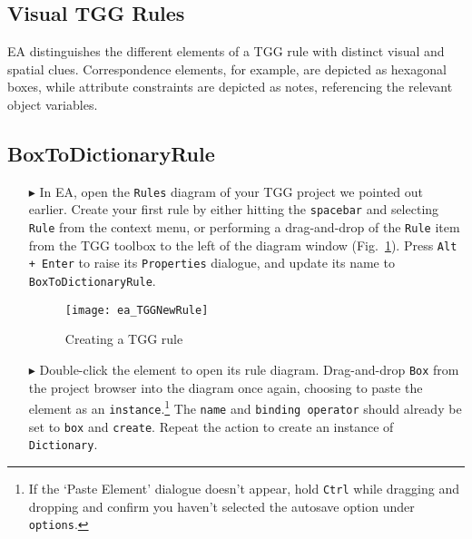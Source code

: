 \newpage
\hypertarget{rules vis}{}
\subsection{Visual TGG Rules}
\visHeader

EA distinguishes the different elements of a TGG rule with distinct visual and spatial clues. Correspondence elements, for example, are depicted as
hexagonal boxes, while attribute constraints are depicted as notes, referencing the relevant object variables.

\subsection{BoxToDictionaryRule}

\begin{enumerate}

\item[$\blacktriangleright$] In EA, open the \texttt{Rules} diagram of your TGG project we pointed out earlier. Create your first rule by either hitting the
\texttt{spacebar} and selecting \texttt{Rule} from the context menu, or performing a drag-and-drop of the \texttt{Rule} item from the TGG toolbox to the left of
the diagram window (Fig.~\ref{ea:create_tgg_rule}). Press \texttt{Alt + Enter} to raise its \texttt{Properties} dialogue, and update its name to
\texttt{BoxToDictionaryRule}.

\vspace{0.5cm}

\begin{figure}[htbp]
\begin{center}
  \texttt{[image: ea\_TGGNewRule]}
  \caption{Creating a TGG rule}
  \label{ea:create_tgg_rule}
\end{center}
\end{figure}

\vspace{0.5cm}

\item[$\blacktriangleright$] Double-click the element to open its rule diagram. Drag-and-drop \texttt{Box} from the project browser into the diagram once
again, choosing to paste the element as an \texttt{instance}.\footnote{If the `Paste Element' dialogue doesn't appear, hold \texttt{Ctrl} while dragging and
dropping and confirm you haven't selected the autosave option under \texttt{options}.} The \texttt{name} and \texttt{binding operator} should already be set to
\texttt{box} and \texttt{create}. Repeat the action to create an instance of \texttt{Dictionary}.


\end{enumerate}

